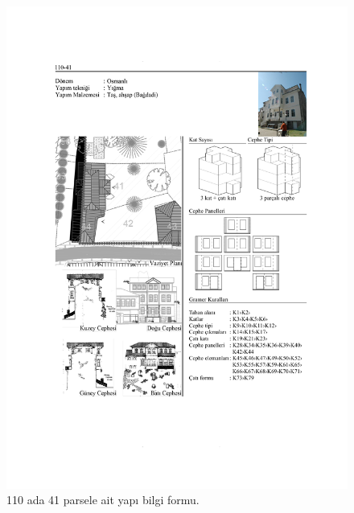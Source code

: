 \begin{figure}
\centering
\includegraphics[width=1\textwidth,height=\textheight]{source/figures/BilgiFormlari/110-41.pdf}
\caption{110 ada 41 parsele ait yapı bilgi formu.}
\end{figure}

